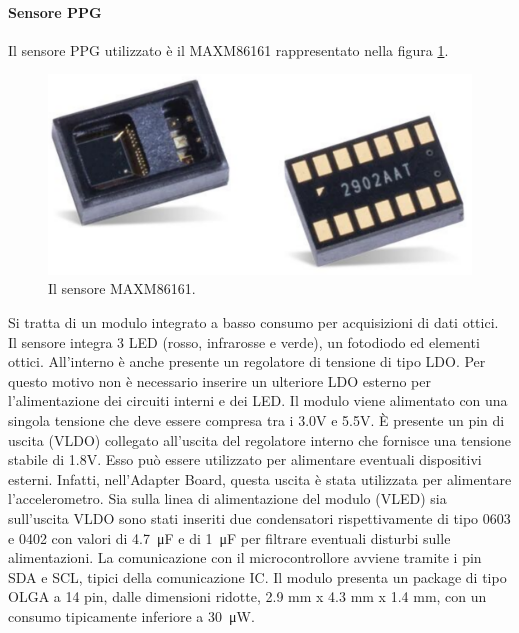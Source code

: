 \paragraph{Sensore PPG} Il sensore PPG utilizzato è il MAXM86161 rappresentato nella figura \ref{fig:ImmagineMAXM86161}.
\begin{figure}[tb]
	\centering
	\includegraphics[width=0.6\linewidth]{ImageFiles/Hardware/ImmagineMAXM86161}
	\caption{Il sensore MAXM86161.}
	\label{fig:ImmagineMAXM86161}
\end{figure}
Si tratta di un modulo integrato a basso consumo per acquisizioni di dati ottici. Il sensore integra 3 LED (rosso, infrarosse e verde), un fotodiodo ed elementi ottici. All'interno è anche presente un regolatore di tensione di tipo LDO. Per questo motivo non è necessario inserire un ulteriore LDO esterno per l'alimentazione dei circuiti interni e dei LED. Il modulo viene alimentato con una singola tensione che deve essere compresa tra i 3.0V e 5.5V. \`E presente un pin di uscita (VLDO) collegato all'uscita del regolatore interno che fornisce una tensione stabile di 1.8V. Esso può essere utilizzato per alimentare eventuali dispositivi esterni. Infatti, nell'Adapter Board, questa uscita è stata utilizzata per alimentare l'accelerometro. Sia sulla linea di alimentazione del modulo (VLED) sia sull'uscita VLDO sono stati inseriti due condensatori rispettivamente di tipo 0603 e 0402 con valori di \SI{4.7}{\micro\farad} e di \SI{1}{\micro\farad} per filtrare eventuali disturbi sulle alimentazioni. La comunicazione con il microcontrollore avviene tramite i pin SDA e SCL, tipici della comunicazione IC. Il modulo presenta un package di tipo OLGA a 14 pin, dalle dimensioni ridotte, 2.9 mm x 4.3 mm x 1.4 mm, con un consumo tipicamente inferiore a \SI{30}{\micro\watt}.

